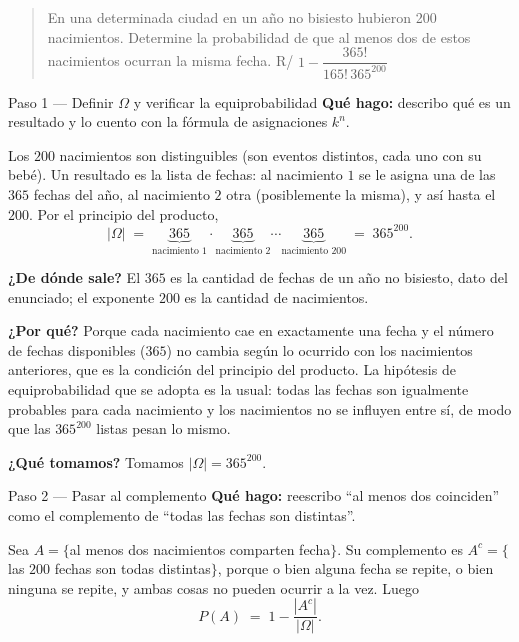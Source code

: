 \documentclass[11pt]{article}
\begin{document}
\begin{quote}
En una determinada ciudad en un a\~no no bisiesto hubieron 200 nacimientos. Determine la probabilidad de que al menos dos de estos nacimientos ocurran la misma fecha. \hfill R/ $1-\dfrac{365!}{165!\,365^{200}}$
\end{quote}

\begin{sol}

\begin{paso}{Paso 1 --- Definir $\Omega$ y verificar la equiprobabilidad}
\textbf{Qu\'e hago:} describo qu\'e es un resultado y lo cuento con la f\'ormula de asignaciones $k^{n}$.

Los $200$ nacimientos son distinguibles (son eventos distintos, cada uno con su beb\'e). Un resultado es la lista de fechas: al nacimiento $1$ se le asigna una de las $365$ fechas del a\~no, al nacimiento $2$ otra (posiblemente la misma), y as\'i hasta el $200$. Por el principio del producto,
\[
|\Omega| \;=\; \underbrace{365}_{\text{nacimiento 1}}\cdot\underbrace{365}_{\text{nacimiento 2}}\cdots\underbrace{365}_{\text{nacimiento 200}} \;=\; 365^{200}.
\]

\textbf{¿De d\'onde sale?} El $365$ es la cantidad de fechas de un a\~no no bisiesto, dato del enunciado; el exponente $200$ es la cantidad de nacimientos.

\textbf{¿Por qu\'e?} Porque cada nacimiento cae en exactamente una fecha y el n\'umero de fechas disponibles ($365$) no cambia seg\'un lo ocurrido con los nacimientos anteriores, que es la condici\'on del principio del producto. La hip\'otesis de equiprobabilidad que se adopta es la usual: todas las fechas son igualmente probables para cada nacimiento y los nacimientos no se influyen entre s\'i, de modo que las $365^{200}$ listas pesan lo mismo.

\textbf{¿Qu\'e tomamos?} Tomamos $|\Omega|=365^{200}$.
\end{paso}

\begin{paso}{Paso 2 --- Pasar al complemento}
\textbf{Qu\'e hago:} reescribo ``al menos dos coinciden'' como el complemento de ``todas las fechas son distintas''.

Sea $A=\{$al menos dos nacimientos comparten fecha$\}$. Su complemento es $A^{c}=\{$las $200$ fechas son todas distintas$\}$, porque o bien alguna fecha se repite, o bien ninguna se repite, y ambas cosas no pueden ocurrir a la vez. Luego
\[
P(A)\;=\;1-\frac{|A^{c}|}{|\Omega|}.
\]


\end{paso}
\end{sol}
\end{document}
